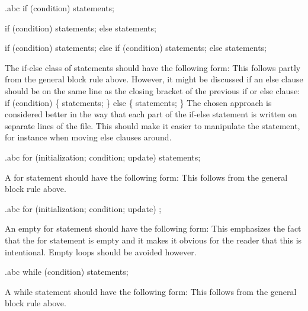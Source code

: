 \begin{filecontents*}{\jobname.abc}
	if (condition) {
	    statements;
	}
	
	if (condition) {
	    statements;
	}
	else {
	    statements;
	}
	
	if (condition) {
	    statements;
	}
	else if (condition) {
	    statements;
	}
	else {
	    statements;
	}
\end{filecontents*}

\recommendation
{The if-else class of statements should have the following form:}
{}
{
	This follows partly from the general block rule above. However, it might be discussed if an else clause should be on the same line as the closing bracket of the previous if or else clause:\newline
	if (condition) \{\newline
		statements;\newline
	\} else \{\newline
		statements;\newline
	\}\newline
	The chosen approach is considered better in the way that each part of the if-else statement is written on separate lines of the file. This should make it easier to manipulate the statement, for instance when moving else clauses around.
}


\begin{filecontents*}{\jobname.abc}
	for (initialization; condition; update) {
	    statements;
	}
\end{filecontents*}

\recommendation
{A for statement should have the following form:}
{}
{This follows from the general block rule above.}


\begin{filecontents*}{\jobname.abc}
	for (initialization; condition; update)
	    ;
\end{filecontents*}

\recommendation
{An empty for statement should have the following form:}
{}
{This emphasizes the fact that the for statement is empty and it makes it obvious for the reader that this is intentional. Empty loops should be avoided however.}


\begin{filecontents*}{\jobname.abc}
	while (condition) {
	    statements;
	}
\end{filecontents*}

\recommendation
{A while statement should have the following form:}
{}
{This follows from the general block rule above.}


